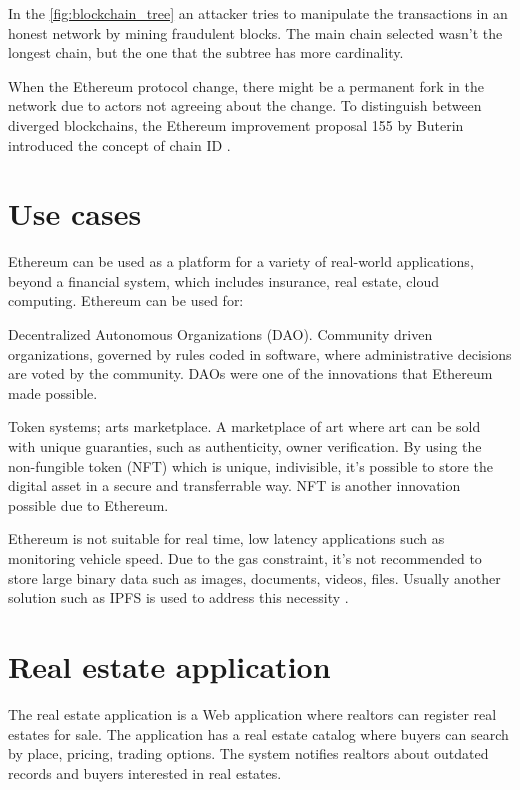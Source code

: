 \documentclass[
    article, 
    12pt,				%
	oneside,			%
	a4paper,			%
	chapter=TITLE,		%
	section=TITLE,		%
	english,			%
	english,				%
	sumario=tradicional
]{abntex2}
\begin{document}
In the \autoref{fig:blockchain_tree} an attacker tries to manipulate the transactions in an honest network by mining fraudulent blocks. 
The main chain selected wasn't the longest chain, but the one that the subtree has more cardinality. 

When the Ethereum protocol change, there might be a permanent fork in the network due to actors not agreeing about the change.
To distinguish between diverged blockchains, the Ethereum improvement proposal 155 by Buterin introduced the concept of chain ID \cite{wood_ethereum_2021}.


\section{Use cases}

Ethereum can be used as a platform for a variety of real-world applications, beyond a financial system, which includes insurance, real estate, cloud computing. Ethereum can be used for:

\begin{alineas}
    \item Decentralized Autonomous Organizations (DAO). 
    Community driven organizations, governed by rules coded in software, where administrative decisions are voted by the community.
    DAOs were one of the innovations that Ethereum made possible.
    
    \item Token systems; arts marketplace.
    A marketplace of art where art can be sold with unique guaranties, such as authenticity, owner verification.
    By using the non-fungible token (NFT) which is unique, indivisible, it's possible to store the digital asset in a secure and transferrable way.
    NFT is another innovation possible due to Ethereum.
\end{alineas}

Ethereum is not suitable for real time, low latency applications such as monitoring vehicle speed.
Due to the gas constraint, it's not recommended to store large binary data such as images, documents, videos, files.
Usually another solution such as IPFS is used to address this necessity \cite{ethereum_data_store_kostamis_2021}.


\section{Real estate application}

The real estate application is a Web application where realtors can register real estates for sale.
The application has a real estate catalog where buyers can search by place, pricing, trading options.
The system notifies realtors about outdated records and buyers interested in real estates.
\end{document}
